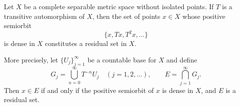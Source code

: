 Let $X$ be a complete separable metric space without isolated points. If $T$ is a transitive automorphism of $X$, then the set of points $x \in X$ whose positive semiorbit
$$\{x, Tx, T^2x, \ldots\}$$
is dense in $X$ constitutes a residual set in $X$.

More precisely, let $\{U_j\}_{j=1}^{\infty}$ be a countable base for $X$ and define
$$G_j = \bigcup_{n=0}^{\infty} T^{-n} U_j \quad (j = 1, 2, \ldots), \qquad E = \bigcap_{j=1}^{\infty} G_j.$$
Then $x \in E$ if and only if the positive semiorbit of $x$ is dense in $X$, and $E$ is a residual set.
